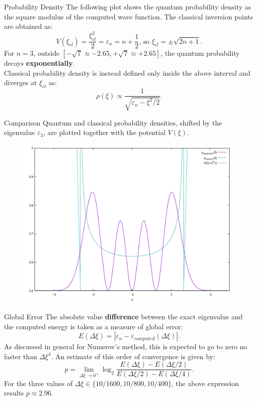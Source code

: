 \documentclass{beamer}
\begin{document}
\begin{frame}{Probability Density}
The following plot shows the quantum probability density as the square modulus of the computed wave function. The classical inversion points are obtained as:
$$V(\xi_{cl})=\frac{\xi_{cl}^2}{2}=\varepsilon_n=n+\frac{1}{2}\text{, so }\xi_{cl}=\pm\sqrt{2n+1}.$$
For $n=3$, outside $[-\sqrt{7}\approx-2.65,+\sqrt{7}\approx+2.65]$, the quantum probability decays \textbf{exponentially}.\\
\vspace{\baselineskip}
Classical probability density is instead defined only inside the above interval and diverges at $\xi_{cl}$ as:
$$\rho(\xi)\propto\frac{1}{\sqrt{\varepsilon_n-\xi^2/2}}.$$
\end{frame}

\begin{frame}{Comparison}
Quantum and classical probability densities, shifted by the eigenvalue $\varepsilon_3$, are plotted together with the potential $V(\xi)$.
\begin{figure}
\centering
\includegraphics[width=0.75\linewidth]{../gnuplot/imageB.pdf}
\end{figure}
\end{frame}

\begin{frame}{Global Error}
The absolute value \textbf{difference} between the exact eigenvalue and the computed energy is taken as a measure of global error:
$$E(\Delta \xi)=|\varepsilon_n-\varepsilon_{computed}(\Delta \xi)|.$$
As discussed in general for Numerov's method, this is expected to go to zero no faster than $\Delta\xi^4$. An estimate of this order of convergence is given by:
$$p=\lim_{\Delta \xi\to 0^+}\log_2\frac{E(\Delta \xi)-E(\Delta \xi/2)}{E(\Delta \xi/2)-E(\Delta \xi/4)}.$$
For the three values of $\Delta \xi\in\{10/1600,10/800,10/400\}$, the above expression results $p\approx2.96$.
\end{frame}
\end{document}
